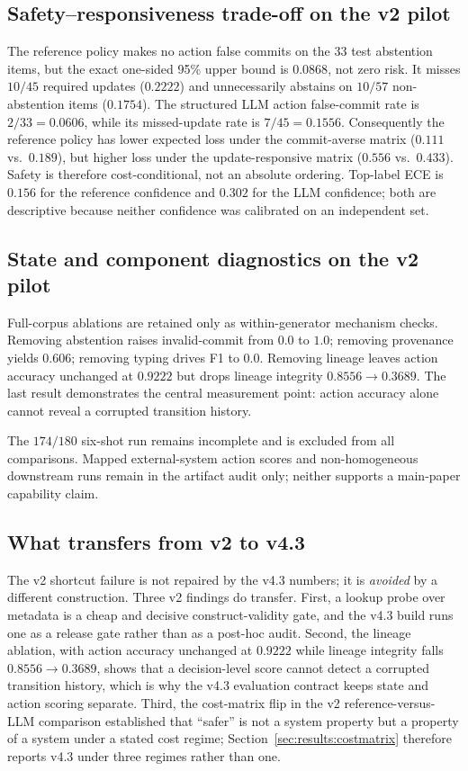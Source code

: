 \subsection{Safety--responsiveness trade-off on the v2 pilot}

The reference policy makes no action false commits on the 33 test abstention items, but
the exact one-sided 95\% upper bound is $0.0868$, not zero risk. It misses
$10/45$ required updates ($0.2222$) and unnecessarily abstains on $10/57$
non-abstention items ($0.1754$). The structured LLM action false-commit rate is
$2/33=0.0606$, while its missed-update rate is $7/45=0.1556$. Consequently the
reference policy has lower expected loss under the commit-averse matrix
($0.111$ vs.\ $0.189$), but higher loss under the update-responsive matrix
($0.556$ vs.\ $0.433$). Safety is therefore cost-conditional, not an absolute
ordering. Top-label ECE is $0.156$ for the reference confidence and $0.302$ for
the LLM confidence; both are descriptive because neither confidence was
calibrated on an independent set.

\subsection{State and component diagnostics on the v2 pilot}

Full-corpus ablations are retained only as within-generator mechanism checks.
Removing abstention raises invalid-commit from $0.0$ to $1.0$; removing
provenance yields $0.606$; removing typing drives \keep{} F1 to $0.0$. Removing
lineage leaves action accuracy unchanged at $0.9222$ but drops lineage integrity
$0.8556\to0.3689$. The last result demonstrates the central measurement point:
action accuracy alone cannot reveal a corrupted transition history.



The $174/180$ six-shot run remains incomplete and is excluded from all
comparisons. Mapped external-system action scores and non-homogeneous downstream
runs remain in the artifact audit only; neither supports a main-paper capability
claim.

\subsection{What transfers from v2 to v4.3}

The v2 shortcut failure is not repaired by the v4.3 numbers; it is
\emph{avoided} by a different construction. Three v2 findings do transfer.
First, a lookup probe over metadata is a cheap and decisive construct-validity
gate, and the v4.3 build runs one as a release gate rather than as a
post-hoc audit. Second, the lineage ablation, with action accuracy unchanged at
$0.9222$ while lineage integrity falls $0.8556 \to 0.3689$, shows that a
decision-level score cannot detect a corrupted transition history, which is why
the v4.3 evaluation contract keeps state and action scoring separate. Third,
the cost-matrix flip in the v2 reference-versus-LLM comparison established that
``safer'' is not a system property but a property of a system under a stated
cost regime; Section~\ref{sec:results:costmatrix} therefore reports v4.3 under
three regimes rather than one.
